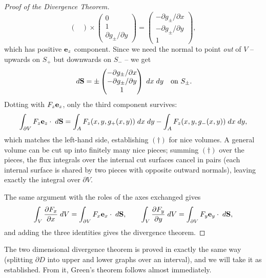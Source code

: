 \documentclass[a4paper]{scrartcl}
\begin{document}
\begin{proof}[Proof of the Divergence Theorem]
$$\begin{pmatrix}
	\end{pmatrix} \times \begin{pmatrix}
		0 \\ 1 \\ \partial g_\pm / \partial y
	\end{pmatrix} = \begin{pmatrix}
		-\partial g_\pm/\partial x \\
		-\partial g_\pm/\partial y \\
		1
	\end{pmatrix},
	$$
	which has positive $\mathbf{e}_z$ component. Since we need the normal to point \emph{out} of $V$ -- upwards on $S_+$ but downwards on $S_-$ -- we get
	$$
	\; d \mathbf{S} = \pm \begin{pmatrix}
		- \partial g_\pm/\partial x \\
		- \partial g_\pm/\partial y \\
		1
	\end{pmatrix} \; d x \; d y \quad \text{on } S_\pm.
	$$
	Dotting with $F_z \mathbf{e}_z$, only the third component survives:
	$$
	\int_{\partial V} F_z \mathbf{e}_z \cdot \; d \mathbf{S} = \int_A F_z(x, y, g_+(x, y)) \; d x \; d y - \int_A F_z(x, y, g_-(x, y)) \; d x \; d y,
	$$
	which matches the left-hand side, establishing $(\dagger)$ for nice volumes. A general volume can be cut up into finitely many nice pieces; summing $(\dagger)$ over the pieces, the flux integrals over the internal cut surfaces cancel in pairs (each internal surface is shared by two pieces with opposite outward normals), leaving exactly the integral over $\partial V$.

	The same argument with the roles of the axes exchanged gives
	$$
	\int_V \frac{\partial F_x}{\partial x} \; d V = \int_{\partial V} F_x \mathbf{e}_x \cdot \; d \mathbf{S}, \quad \quad \int_V \frac{\partial F_y}{\partial y} \; d V = \int_{\partial V} F_y \mathbf{e}_y \cdot \; d \mathbf{S},
	$$
	and adding the three identities gives the divergence theorem.
\end{proof}

The two dimensional divergence theorem is proved in exactly the same way (splitting $\partial D$ into upper and lower graphs over an interval), and we will take it as established. From it, Green's theorem follows almost immediately.
\end{document}
